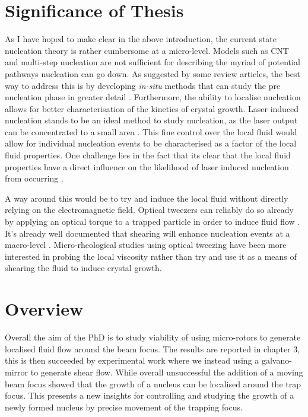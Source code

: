 \section{Significance of Thesis}
As I have hoped to make clear in the above introduction, the 
current state nucleation theory is rather cumbersome at a 
micro-level. Models such as CNT and multi-step nucleation are 
not sufficient for describing the myriad of potential pathways 
nucleation can go down. As suggested by some review articles, 
the best way to address this is by developing \textit{in-situ} 
methods that can study the pre nucleation phase in greater detail 
\cite{Fu2021}. Furthermore, the ability to localise nucleation 
allows for better characterisation of the kinetics of crystal 
growth. Laser induced nucleation stands to be an ideal method to 
study nucleation, as the laser output can be concentrated to a 
small area \cite{Korede2023}. This fine control over the local 
fluid would allow for individual nucleation events to be
characterised as a factor of the local fluid properties. One 
challenge lies in the fact that its clear that the local fluid 
properties have a direct influence on the likelihood of laser
induced nucleation from occurring \cite{Korede2023, Ward2016,
Yuyama2012, Liao2022}. 

A way around this would be to try and induce the local fluid 
without directly relying on the electromagnetic field. Optical 
tweezers can reliably do so already by applying an optical 
torque to a trapped particle in order to induce fluid flow 
\cite{Bishop2004, RobertsonAnderson2018}. It's already well
documented that shearing will enhance nucleation events at a
macro-level \cite{Debuysschere2023}. Micro-rheological studies 
using optical tweezing have been more interested in probing 
the local viscosity rather than try and use it as a means of 
shearing the fluid to induce crystal growth. 

\section{Overview}
Overall the aim of the PhD is to study viability of using 
micro-rotors to generate localised fluid flow around the 
beam focus. The results are reported in chapter 3, this is 
then succeeded by experimental work where we instead using 
a galvano-mirror to generate shear flow. While overall 
unsuccessful the addition of a moving beam focus showed 
that the growth of a nucleus can be localised around the 
trap focus. This presents a new insights for controlling
and studying the growth of a newly formed nucleus by 
precise movement of the trapping focus.

